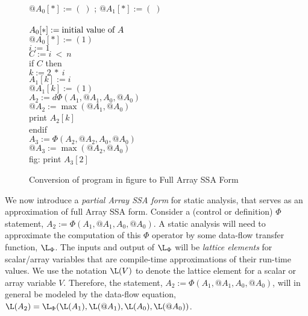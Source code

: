 \begin{figure}%
\begin{center}
\parbox{3.0in}{
\begin{programa}
\Tb $@A_0[*] := (\;)$ ; $@A_1[*] := (\;)$\\
\\
\Tb $A_0[*] := \mbox{\rm initial value of $A$}$\\
\Tb $@A_0[*] := (1)$\\
\Tb $i := 1$ \\
\Tb $C := i\ <\ n $ \\
\Tb if $C$ then \\
\Tc $k :=  2\ *\ i$ \\
\Tc $A_1[k] := i$\\
\Tc $@A_1[k] := (1)$\\
\Tc $A_2 := d\Phi(A_1, @A_1, A_0, @A_0)$\\
\Tc $@A_2 := \max(@A_1, @A_0)$\\
\Tc print $A_2[k]$\\
\Tb endif \\
\Tb $A_3 := \Phi(A_2, @A_2, A_0, @A_0)$\\
\Tb $@A_3 := \max(@A_2, @A_0)$\\fig:
\Tb print $A_3[2]$ 
\end{programa}
}
\end{center}
\caption{Conversion of program in figure \protect{\ref{fig:ssa-acyclic-array}} to Full Array SSA Form}
\label{fig:full-form}
\end{figure}

We now introduce a {\it partial Array SSA form} for static analysis,
that serves as an approximation of full Array SSA form.
Consider a (control or definition) $\Phi$ statement, $A_2 := \Phi(A_1, @A_1, A_0, @A_0)$.
A static analysis will need to 
approximate
the computation of this $\Phi$ operator by 
some data-flow transfer function, $\L_{\Phi}$.
The inputs and output of $\L_{\Phi}$ will be
{\it lattice elements} for scalar/array variables that
are compile-time approximations of their run-time values.
We use the notation $\L(V)$ to denote the lattice element for 
a scalar or array
variable $V$.
Therefore, the 
statement, $A_2 := \Phi(A_1, @A_1, A_0, @A_0)$, will in general
be modeled by the data-flow equation,
$\L(A_2) = \L_{\Phi}(\L(A_1), \L(@A_1), \L(A_0), \L(@A_0))$.

